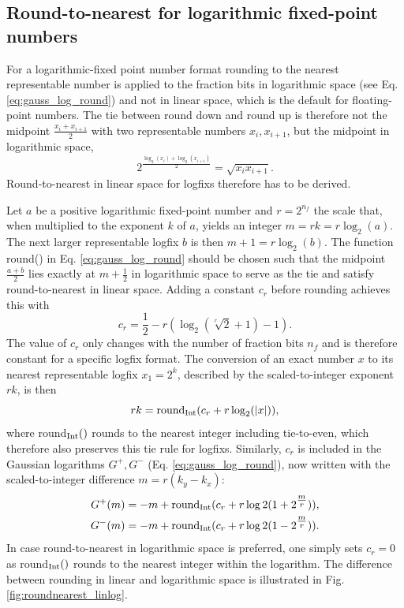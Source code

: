 \subsection{Round-to-nearest for logarithmic fixed-point numbers}
\label{sec:roundnearest_logfix}

For a logarithmic-fixed point number format rounding to the nearest representable number is applied to the fraction bits in
logarithmic space (see Eq. \ref{eq:gauss_log_round}) and not in linear space, which is the default for floating-point numbers.
The tie between round down and round up is therefore not the midpoint $\tfrac{x_i + x_{i+1}}{2}$ with two representable
numbers $x_i,x_{i+1}$, but the midpoint in logarithmic space,
\begin{equation}
2^{\tfrac{\log_2(x_i) + \log_2(x_{i+1})}{2}} = \sqrt{x_ix_{i+1}}.
\end{equation}
Round-to-nearest in linear space for logfixs therefore has to be derived.

Let $a$ be a positive logarithmic fixed-point number and $r = 2^{n_f}$ the scale that, when multiplied to the
exponent $k$ of $a$, yields an integer $m = rk = r\log_2(a)$. The next larger representable logfix $b$ is then 
$m + 1 = r \log_2(b)$. The function round() in Eq. \ref{eq:gauss_log_round} should be chosen such that the
midpoint $\tfrac{a+b}{2}$ lies exactly at $m + \tfrac{1}{2}$ in logarithmic space to serve as the tie and
satisfy round-to-nearest in linear space. Adding a constant $c_r$ before rounding achieves this with
\begin{equation}
c_r  = \frac{1}{2} - r(\log_2(\sqrt[r]{2} + 1)-1).
\label{eq:roundnearest_logfix_cr}
\end{equation}
The value of $c_r$ only changes with the number of fraction bits $n_f$ and is therefore constant for a specific
logfix format. The conversion of an exact number $x$ to its nearest representable logfix $x_1 = 2^k$, described
by the scaled-to-integer exponent $rk$, is then
\begin{equation}
rk = \text{round}_{\operatorname{Int}}(c_r + r\log_2(\vert x \vert)),
\end{equation}
where round$_{\operatorname{Int}}()$ rounds to the nearest integer including tie-to-even, which therefore also preserves
this tie rule for logfixs. Similarly, $c_r$ is included in the Gaussian logarithms $G^+,G^-$
(Eq. \ref{eq:gauss_log_round}), now written with the scaled-to-integer difference $m = r(k_y - k_x)$:
\begin{align}
	G^+(m) &= -m + \text{round}_{\operatorname{Int}}( c_r + r\log2(1+2^{\tfrac{m}{r}})), \nonumber \\
	G^-(m) &= -m + \text{round}_{\operatorname{Int}}( c_r + r\log2(1-2^{\tfrac{m}{r}})).
\end{align}
In case round-to-nearest in logarithmic space is preferred, one simply sets $c_r = 0$ as round$_{\operatorname{Int}}()$
rounds to the nearest integer within the logarithm. The difference between rounding in linear and logarithmic
space is illustrated in Fig. \ref{fig:roundnearest_linlog}.

